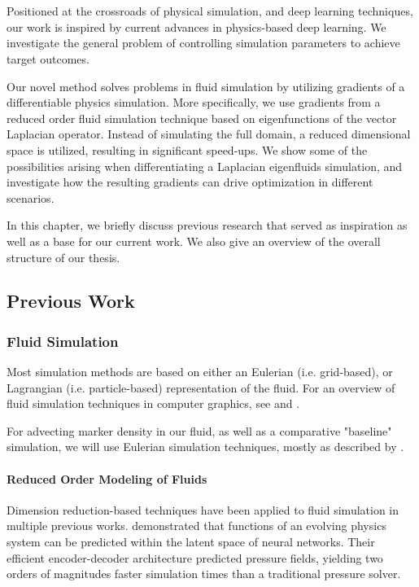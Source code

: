 \chapter{\bevezetes}

Positioned at the crossroads of physical simulation, and deep learning
techniques, our work is inspired by current advances in physics-based deep
learning. We investigate the general problem of controlling simulation
parameters to achieve target outcomes.

Our novel method solves problems in fluid simulation by utilizing gradients of
a differentiable physics simulation. More specifically, we use gradients from
a reduced order fluid simulation technique based on eigenfunctions of the vector
Laplacian operator. Instead of simulating the full domain, a reduced dimensional
space is utilized, resulting in significant speed-ups. We show some of the
possibilities arising when differentiating a Laplacian eigenfluids simulation,
and investigate how the resulting gradients can drive optimization in different
scenarios.

In this chapter, we briefly discuss previous research that served as inspiration
as well as a base for our current work. We also give an overview of the overall
structure of our thesis. 

\section{Previous Work}
\subsection{Fluid Simulation}
Most simulation methods are based on either an Eulerian (i.e.  grid-based), or
Lagrangian (i.e. particle-based) representation of the fluid.  For an overview
of fluid simulation techniques in computer graphics, see \cite{FluidNotes} and
\cite{BridsonFluid}. 

For advecting marker density in our fluid, as well as a comparative "baseline"
simulation, we will use Eulerian simulation techniques, mostly as described by
\cite{StableFluids}.

\subsubsection*{Reduced Order Modeling of Fluids}
Dimension reduction-based techniques have been applied to fluid simulation in
multiple previous works. \cite{Wiewel2019LatentSP} demonstrated that functions
of an evolving physics system can be predicted within the latent space of neural
networks. Their efficient encoder-decoder architecture predicted pressure
fields, yielding two orders of magnitudes faster simulation times than
a traditional pressure solver.

